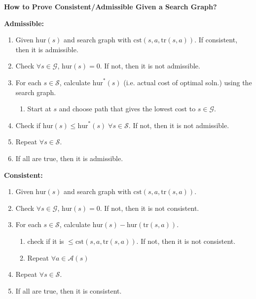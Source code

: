 \begin{process} \textbf{How to Prove Consistent/Admissible Given a Search Graph?}
   
    \textbf{Admissible:}
    \begin{enumerate}
        \item Given $\text{hur}(s)$ and search graph with $\text{cst}(s,a,\text{tr}(s,a))$. If consistent, then it is admissible.
        \item Check $\forall s \in \mathcal{G}$, $\text{hur}(s) = 0$. If not, then it is not admissible.
        \item For each $s \in \mathcal{S}$, calculate $\text{hur}^*(s)$ (i.e. actual cost of optimal soln.) using the search graph.
        \begin{enumerate}
            \item Start at $s$ and choose path that gives the lowest cost to $s \in \mathcal{G}$. 
        \end{enumerate}
        \item Check if $\text{hur}(s) \leq \text{hur}^*(s) \; \forall s \in \mathcal{S}$. If not, then it is not admissible.
        \item Repeat $\forall s \in \mathcal{S}$. 
        \item If all are true, then it is admissible.
    \end{enumerate}
    \vspace{1em}

    \textbf{Consistent:}
    \begin{enumerate}
        \item Given $\text{hur}(s)$ and search graph with $\text{cst}(s,a,\text{tr}(s,a))$. 
        \item Check $\forall s \in \mathcal{G}$, $\text{hur}(s) = 0$. If not, then it is not consistent.
        \item For each $s \in \mathcal{S}$, calculate $\text{hur}(s) - \text{hur}(\text{tr}(s, a))$.
        \begin{enumerate}
            \item check if it is $\leq \text{cst}(s,a,\text{tr}(s,a))$. If not, then it is not consistent.
            \item Repeat $\forall a \in \mathcal{A}(s)$
        \end{enumerate}
        \item Repeat $\forall s \in \mathcal{S}$.
        \item If all are true, then it is consistent.
    \end{enumerate}
\end{process}

